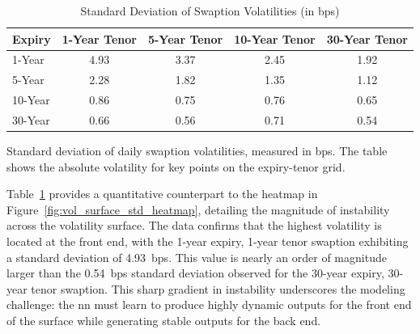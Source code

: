 \begin{table}[H]
	\centering
	\begin{threeparttable}
		\caption{Standard Deviation of Swaption Volatilities (in \ac{bps})}
		\label{tab:vol_std_summary}
		\begin{tabular}{lcccc}
			\toprule
			\textbf{Expiry} & \textbf{1-Year Tenor} & \textbf{5-Year Tenor} & \textbf{10-Year Tenor} & \textbf{30-Year Tenor} \\
			\midrule
			1-Year          & 4.93                  & 3.37                  & 2.45                   & 1.92                   \\
			5-Year          & 2.28                  & 1.82                  & 1.35                   & 1.12                   \\
			10-Year         & 0.86                  & 0.75                  & 0.76                   & 0.65                   \\
			30-Year         & 0.66                  & 0.56                  & 0.71                   & 0.54                   \\
			\bottomrule
		\end{tabular}
		\begin{tablenotes}
			\footnotesize
			\item  Standard deviation of daily swaption volatilities, measured in \ac{bps}. The table shows the absolute volatility for key points on the expiry-tenor grid.
		\end{tablenotes}
	\end{threeparttable}
\end{table}

Table~\ref{tab:vol_std_summary} provides a quantitative counterpart to the heatmap in Figure~\ref{fig:vol_surface_std_heatmap}, detailing the magnitude of instability across the volatility surface. The data confirms that the highest volatility is located at the front end, with the 1-year expiry, 1-year tenor swaption exhibiting a standard deviation of 4.93~\ac{bps}. This value is nearly an order of magnitude larger than the 0.54~\ac{bps} standard deviation observed for the 30-year expiry, 30-year tenor swaption. This sharp gradient in instability underscores the modeling challenge: the \ac{nn} must learn to produce highly dynamic outputs for the front end of the surface while generating stable outputs for the back end.

